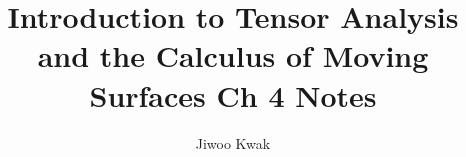 \documentclass[A4]{textbook}
\title{Introduction to Tensor Analysis and the Calculus of Moving Surfaces Ch 4 Notes}
\author{Jiwoo Kwak}
\begin{document}
\maketitle%

\tableofcontents

%
%


\nocite{*} 
\printbibliography
\end{document}
